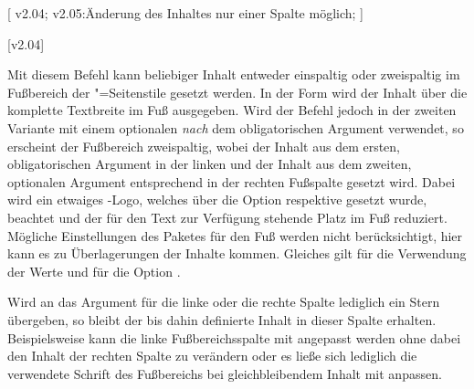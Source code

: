\begin{DeclareEntity*}{}
\begin{DeclareEntity*}{}
\begin{DeclareEntity*}{}
\begin{Declaration}
  {}
  [
    v2.04;
    v2.05:Änderung des Inhaltes nur einer Spalte möglich;
  ]
\begin{Declaration}
  {}
  [v2.04]

Mit diesem Befehl kann beliebiger Inhalt entweder einspaltig oder zweispaltig 
im Fußbereich der "=Seitenstile gesetzt werden. In der 
Form  wird der Inhalt über die komplette 
Textbreite im Fuß ausgegeben. Wird der Befehl jedoch in der zweiten Variante 
 mit einem 
optionalen \emph{nach} dem obligatorischen Argument verwendet, so erscheint der 
Fußbereich zweispaltig, wobei der Inhalt aus dem ersten, obligatorischen 
Argument in der linken und der Inhalt aus dem zweiten, optionalen Argument 
entsprechend in der rechten Fußspalte gesetzt wird. Dabei wird ein etwaiges 
\DDC-Logo, welches über die Option  respektive  
gesetzt wurde, beachtet und der für den Text zur Verfügung stehende Platz im 
Fuß reduziert. Mögliche Einstellungen des Paketes  
für den Fuß werden nicht berücksichtigt, hier kann es zu Überlagerungen der 
Inhalte kommen. Gleiches gilt für die Verwendung der Werte  und 
 für die Option .

%
Wird an das Argument für die linke oder die rechte Spalte lediglich ein Stern 
\PValue{*} übergeben, so bleibt der bis dahin definierte Inhalt in dieser 
Spalte erhalten. Beispielsweise kann die linke Fußbereichsspalte mit 
 angepasst werden ohne dabei den 
Inhalt der rechten Spalte zu verändern oder es ließe sich lediglich die 
verwendete Schrift des Fußbereichs bei gleichbleibendem Inhalt mit 
 anpassen.


\end{Declaration}
\end{Declaration}
\end{DeclareEntity*}
\end{DeclareEntity*}
\end{DeclareEntity*}
